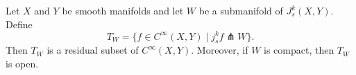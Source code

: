Let $X$ and $Y$ be smooth manifolds and let $W$ be a submanifold of $J_s^k(X, Y)$. Define
$$T_W = \{f \in C^\infty(X, Y) \mid j_s^k f \pitchfork W\}.$$
Then $T_W$ is a residual subset of $C^\infty(X, Y)$. Moreover, if $W$ is compact, then $T_W$ is open.
